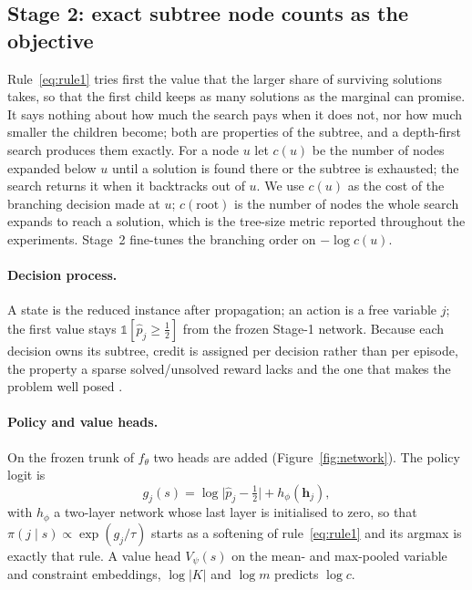 \documentclass[final,5p,times,twocolumn,authoryear]{elsarticle}
\begin{document}
\subsection{Stage 2: exact subtree node counts as the objective}
\label{sec:method-stage2}

Rule~\eqref{eq:rule1} tries first the value that the larger share of surviving solutions takes, so that the first child keeps as many solutions as the marginal can promise. It says nothing about how much the search pays when it does not, nor how much smaller the children become; both are properties of the subtree, and a depth-first search produces them exactly. For a node $u$ let $c(u)$ be the number of nodes expanded below $u$ until a solution is found there or the subtree is exhausted; the search returns it when it backtracks out of $u$. We use $c(u)$ as the cost of the branching decision made at $u$; $c(\text{root})$ is the number of nodes the whole search expands to reach a solution, which is the tree-size metric reported throughout the experiments. Stage~2 fine-tunes the branching order on $-\log c(u)$.

\paragraph{Decision process.} A state is the reduced instance after propagation; an action is a free variable $j$; the first value stays $\mathbb{1}[\hat p_j\ge\frac12]$ from the frozen Stage-1 network. Because each decision owns its subtree, credit is assigned per decision rather than per episode, the property a sparse solved/unsolved reward lacks and the one that makes the problem well posed \citep{etheve2020reinforcement}.

\paragraph{Policy and value heads.} On the frozen trunk of $f_\theta$ two heads are added (Figure~\ref{fig:network}). The policy logit is
\begin{equation}
g_j(s)=\log\bigl|\hat p_j-\tfrac12\bigr|+h_\phi(\mathbf{h}_j),
\label{eq:policy}
\end{equation}
with $h_\phi$ a two-layer network whose last layer is initialised to zero, so that $\pi(j\mid s)\propto\exp(g_j/\tau)$ starts as a softening of rule~\eqref{eq:rule1} and its argmax is exactly that rule. A value head $V_\psi(s)$ on the mean- and max-pooled variable and constraint embeddings, $\log|K|$ and $\log m$ predicts $\log c$.
\end{document}
